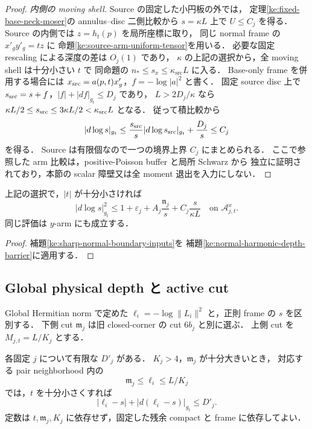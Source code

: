 \begin{proof}
\emph{内側の moving shell.}
Source の固定した小円板の外では，
定理\ref{ke:fixed-base-neck-moser}の annulus--disc 二側比較から
$s=\kappa L$ 上で $U\le C_j$ を得る．
Source の内側では $z=h_t(p)$ を局所座標に取り，
同じ normal frame の $x'_g y'_g=tz$ に
命題\ref{ke:source-arm-uniform-tensor}を用いる．
必要な固定 rescaling による深度の差は $O_j(1)$ であり，
$\kappa$ の上記の選択から，全 moving shell は十分小さい $t$ で
同命題の $n_*\le s_x\le\kappa_{\mathrm{src}}L$ に入る．
Base-only frame を併用する場合には
$x_{\rm src}=a(p,t)x'_g$，$f=-\log|a|^2$ と書く．
固定 source disc 上で $s_{\rm src}=s+f$，$|f|+|df|_{g_t}\le D_j$ であり，
$L>2D_j/\kappa$ なら
$\kappa L/2\le s_{\rm src}\le3\kappa L/2<\kappa_{\rm src}L$ となる．
従って積比較から
\[
 |d\log s|_{g_t}
 \le\frac{s_{\rm src}}s|d\log s_{\rm src}|_{g_t}
                  +\frac{D_j}s\le C_j
\]
を得る．
Source は有限個なので一つの境界上界 $C_j$ にまとめられる．
ここで参照した arm 比較は，positive-Poisson buffer と局所 Schwarz から
独立に証明されており，本節の scalar 障壁又は全 moment 退出を入力にしない．
\end{proof}

\begin{proposition}
\label{ke:sharp-scalar-normal-barrier}
上記の選択で，$|t|$ が十分小さければ
\begin{equation}\label{ke:eq:sharp-scalar-normal-barrier}
 |d\log s|_{g_t}^2
 \le1+\varepsilon_j+A_j\frac{\mathfrak n_j}{s}
                  +C_j\frac{s}{\kappa L}
 \quad\text{on }\mathcal A^x_{j,t}.
\end{equation}
同じ評価は $y$-arm にも成立する．
\end{proposition}

\begin{proof}
補題\ref{ke:sharp-normal-boundary-inputs}を
補題\ref{ke:normal-harmonic-depth-barrier}に適用する．
\end{proof}

\subsection{Global physical depth と active cut}

Global Hermitian norm で定めた
$\ell_i=-\log\|L_i\|^2$ と，正則 frame の $s$ を区別する．
下側 cut $\mathfrak m_j$ は旧 closed-corner の cut $6b_j$ と別に選ぶ．
上側 cut を $M_{j,t}=L/K_j$ とする．

\begin{lemma}
\label{ke:sharp-normal-physical-unit}
各固定 $j$ について有限な $D'_j$ がある．
$K_j>4$，$\mathfrak m_j$ が十分大きいとき，
対応する pair neighborhood 内の
\[
 \mathfrak m_j\le\ell_i\le L/K_j
\]
では，$t$ を十分小さくすれば
\begin{equation}\label{ke:eq:sharp-normal-physical-unit}
 |\ell_i-s|+|d(\ell_i-s)|_{g_t}\le D'_j.
\end{equation}
定数は $t,\mathfrak m_j,K_j$ に依存せず，固定した残余 compact と
frame に依存してよい．
\end{lemma}

